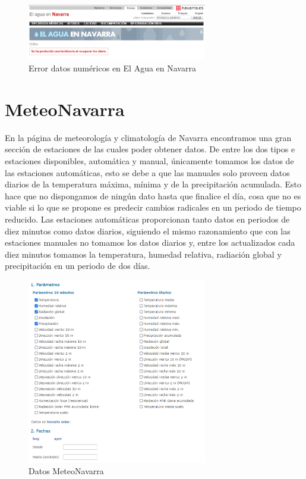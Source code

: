 \begin{figure} [h!]
	\centering
	\includegraphics[width=0.7\textwidth]{fig/ErrorAguaEnNavarra.png}
	\caption[Error al cargar directamente la página de datos numéricos en El Agua en Navarra]{Error datos numéricos en El Agua en Navarra}
	\label{fig:ej5}
\end{figure}

\section{MeteoNavarra}
En la página de meteorología y climatología de Navarra encontramos una gran sección de estaciones de las cuales poder obtener datos.
\newline
\newline
De entre los dos tipos e estaciones disponibles, automática y manual, únicamente tomamos los datos de las estaciones automáticas, esto se debe a que las manuales solo proveen datos diarios de la temperatura máxima, mínima y de la precipitación acumulada. Esto hace que no dispongamos de ningún dato hasta que finalice el día, cosa que no es viable si lo que se propone es predecir cambios radicales en un periodo de tiempo reducido.
\newline
\newline
Las estaciones automáticas proporcionan tanto datos en periodos de diez minutos como datos diarios, siguiendo el mismo razonamiento que con las estaciones manuales no tomamos los datos diarios y, entre los actualizados cada diez minutos tomamos la temperatura, humedad relativa, radiación global y precipitación en un periodo de dos días.

\begin{figure} [h!]
	\centering
	\includegraphics[width=0.7\textwidth]{fig/DatosMeteoNavarra.png}
	\caption[Apartado selección de datos MeteoNavarra]{Datos MeteoNavarra}
	\label{fig:ej6}
\end{figure}

